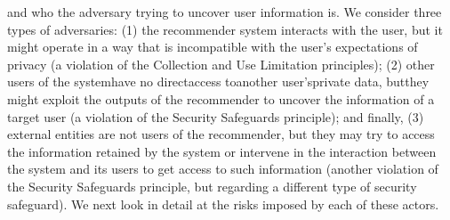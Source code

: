 and who the adversary trying to uncover user information is. We consider three
types of adversaries: (1) the recommender system interacts with the user, but it
might operate in a way that is incompatible with the user’s expectations of privacy
(a violation of the Collection and Use Limitation principles); (2) other users of the
systemhave no directaccess toanother user’sprivate data, butthey might exploit the
outputs of the recommender to uncover the information of a target user (a violation
of the Security Safeguards principle); and finally, (3) external entities are not users
of the recommender, but they may try to access the information retained by the
system or intervene in the interaction between the system and its users to get access
to such information (another violation of the Security Safeguards principle, but
regarding a different type of security safeguard). We next look in detail at the risks
imposed by each of these actors.